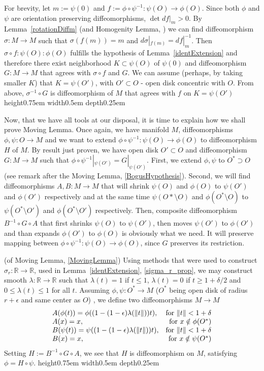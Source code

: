 \documentclass[8pt]{article} %
\newcommand{\norm}[1]{\|#1\|}
\newenvironment{proof}[1][Proof]{\begin{trivlist}
\item[\hskip \labelsep {\bfseries #1}]}{\qed\end{trivlist}}
\newcommand{\qed}{\nobreak \ifvmode \relax \else
\ifdim\lastskip<1.5em \hskip-\lastskip
\hskip1.5em plus0em minus0.5em \fi \nobreak
  \vrule height0.75em width0.5em depth0.25em\fi}
\begin{document}
\begin{proof}
	For brevity, let $m:=\psi(0)$ and
	$f:=\phi\circ\psi^{-1}:\psi(O)\rightarrow\phi(O)$. Since both $\phi$ and $\psi$ are orientation preserving diffeomorphisms,
	$\det df|_m>0$. By Lemma~\ref{rotationDiffm} (and Homogenity Lemma, \cite[p. 22]{diffTopo}) we can find diffeomorphism $\sigma:M\to M$
	such that $\sigma(f(m))=m$ and $d\sigma|_{f(m)}=df|_m^{-1}$. Then $\sigma\circ f:\psi(O):\phi(O)
	$ fulfills the hypothesis of Lemma~\ref{identExtension}
	and therefore there exist neighborhood $K\subset \psi(O)$ of $\psi(0)$
	and diffeomorphism $G:M\to M$ that agrees with $\sigma\circ f$ and $G$.
	We can assume (perhaps, by taking smaller $K$) that $K=\psi(O')$, with $O'\subset O$ - open disk concentric with $O$. From above,
	$\sigma^{-1}\circ G$ is diffeomorphism of $M$ that agrees with $f$ on $K=\psi(O')$
\end{proof}
Now, that we have all tools at our disposal, it is time to explain how we shall prove Moving Lemma. Once again, we have manifold $M$,
diffeomorphisms $\phi,\psi:O\rightarrow M$ and we want to extend $\phi\circ\psi^{-1}:\psi(O)\to\phi(O)$ to diffeomorphism $H$ of $M$. By result
just proven, we have open disk $O'\subset O$ and diffeomorphism $G:M\to M$ such that $\phi\circ\psi^{-1}|_{\psi(O')}=G|_{\psi(O')}$. First,
we extend $\phi,\psi$ to $O^*\supset O$ (see remark after the Moving Lemma, \ref{BogusHypothesis}).
Second,
we will find diffeomorphisms $A,B:M\to M$ that will shrink $\psi(O)$ and $\phi(O)$ to $\psi(O')$ and $\phi(O')$ respectively and at the same time
$\psi(O*\setminus O)$ and $\phi(O^*\setminus O)$ to $\psi(O^*\setminus O')$ and $\phi(O^*\setminus O')$ respectively. Then, composite diffeomorphism
$B^{-1}\circ G\circ A$ that first shrinks $\psi(O)$ to $\psi(O')$, then moves $\psi(O')$ to $\phi(O')$ and than expands $\phi(O')$ to $\phi(O)$
is obviously what we need. It will preserve mapping between $\phi\circ\psi^{-1}:\psi(O)\to\phi(O)$, since $G$ preserves its restriction.
\begin{proof}{(of Moving Lemma, \ref{MovingLemma}) }
	Using methods that were used to construct $\sigma_r:\mathbb{R}\to\mathbb{R}$, used in Lemma~\ref{identExtension}, \ref{sigma_r_prop},
	we may construct smooth $\lambda:\mathbb{R}\to\mathbb{R}$ such that $\lambda(t)=1$ if $t\leq 1$, $\lambda(t)=0$ if $t\geq 1+\delta/2$ and
	$0\leq \lambda(t) \leq 1$ for all $t$. Assuming $\phi,\psi:O^*\to M$ ($O^*$ being open disk of radius $r+\epsilon$ and same center as $O$)
	, we define two diffeomorphisms $M\to M$
\[\begin{array}{l r}
	A(\phi(t))=\phi((1-(1-\epsilon)\lambda(\norm{t}))t), & \mbox{for }\norm{t}<1+\delta\\
	A(x)=x, & \mbox{for }x\notin \phi(O^*)\\
	B(\psi(t))=\psi((1-(1-\epsilon)\lambda(\norm{t}))t), & \mbox{for }\norm{t}<1+\delta\\
	B(x)=x, & \mbox{for }x\notin \psi(O^*)\\
\end{array}\]
	Setting $H:=B^{-1}\circ G \circ A$, we see that $H$ is diffeomorphism on $M$, satisfying $\phi=H\circ\psi$.
\end{proof}
\end{document}

